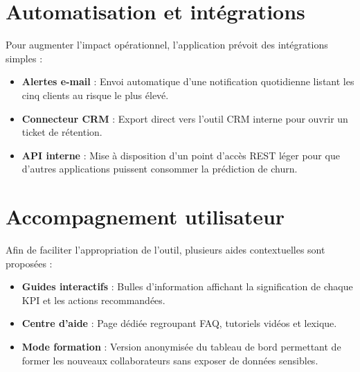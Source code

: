 \section{Automatisation et intégrations}
Pour augmenter l'impact opérationnel, l'application prévoit des intégrations simples :
\begin{itemize}
    \item \textbf{Alertes e-mail} : Envoi automatique d'une notification quotidienne listant les cinq clients au risque le plus élevé.
    \item \textbf{Connecteur CRM} : Export direct vers l'outil CRM interne pour ouvrir un ticket de rétention.
    \item \textbf{API interne} : Mise à disposition d'un point d'accès REST léger pour que d'autres applications puissent consommer la prédiction de churn.
\end{itemize}

\section{Accompagnement utilisateur}
Afin de faciliter l'appropriation de l'outil, plusieurs aides contextuelles sont proposées :
\begin{itemize}
    \item \textbf{Guides interactifs} : Bulles d'information affichant la signification de chaque KPI et les actions recommandées.
    \item \textbf{Centre d'aide} : Page dédiée regroupant FAQ, tutoriels vidéos et lexique.
    \item \textbf{Mode formation} : Version anonymisée du tableau de bord permettant de former les nouveaux collaborateurs sans exposer de données sensibles.
\end{itemize}
